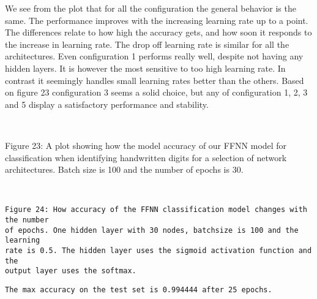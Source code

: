 \documentclass[11pt]{article}
\begin{document}
We see from the plot that for all the configuration the general behavior
is the same. The performance improves with the increasing learning rate
up to a point. The differences relate to how high the accuracy gets, and
how soon it responds to the increase in learning rate. The drop off
learning rate is similar for all the architectures. Even configuration 1
performs really well, despite not having any hidden layers. It is
however the most sensitive to too high learning rate. In contrast it
seemingly handles small learning rates better than the others. Based on
figure 23 configuration 3 seems a solid choice, but any of configuration 1, 2, 3
and 5 display a satisfactory performance and stability.


    \begin{center}
    \end{center}
    { \hspace*{\fill} \\}
    
    Figure 23: A plot showing how the model accuracy of our FFNN model for
classification when identifying handwritten digits for a selection of
network architectures. Batch size is 100 and the number of epochs is 30.


    \begin{center}
    \end{center}
    { \hspace*{\fill} \\}
    
    \begin{Verbatim}[commandchars=\\\{\}]
Figure 24: How accuracy of the FFNN classification model changes with the number
of epochs. One hidden layer with 30 nodes, batchsize is 100 and the learning
rate is 0.5. The hidden layer uses the sigmoid activation function and the
output layer uses the softmax.
    \end{Verbatim}

    \begin{Verbatim}[commandchars=\\\{\}]
The max accuracy on the test set is 0.994444 after 25 epochs.
    \end{Verbatim}


    \begin{center}
    \end{center}
    { \hspace*{\fill} \\}
    
\end{document}
